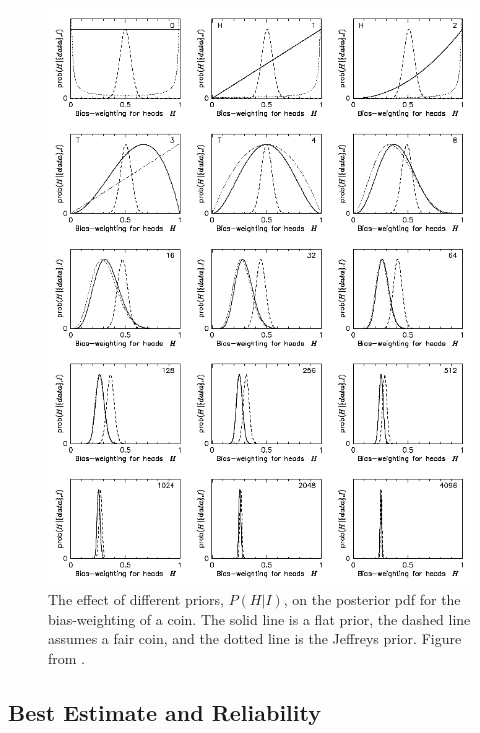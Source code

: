 \documentclass[twoside,english]{uiofysmaster}
\begin{document}
\begin{figure}
\centering
\includegraphics[scale=0.65]{sivia_coin_toss.png}
\caption{The effect of different priors, $P(H|I)$, on the posterior pdf for the bias-weighting of a coin. The solid line is a flat prior, the dashed line assumes a fair coin, and the dotted line is the Jeffreys prior. Figure from \cite{sivia2006data}.}
\label{Fig:: gaussian process : Dice throw }
\end{figure}


\subsection{Best Estimate and Reliability}
\end{document}
